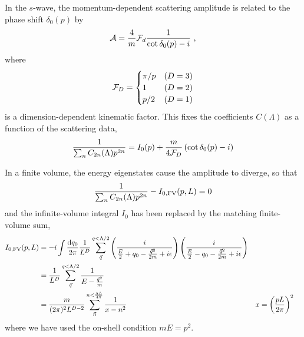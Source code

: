 In the $s$-wave, the momentum-dependent scattering amplitude is related to the phase shift $\delta_0(p)$ by
\begin{equation}\label{eq:cot delta}
    \mathcal{A} = \frac{4}{m}\mathcal{F}_d\frac{1}{\cot \delta_0(p)-i}\ ,
\end{equation}
where
\begin{equation}
    \mathcal{F}_D
    =
    \begin{cases}
        \pi/p   & (D=3)\\
        1       & (D=2)\\
        p/2     & (D=1)
\end{cases}
\end{equation}
is a dimension-dependent kinematic factor.
This fixes the coefficients $C(\Lambda)$ as a function of the scattering data,
\begin{equation}
    \frac{1}{\sum_n C_{2n}(\Lambda) p^{2n}}
    =
    I_0(p) + \frac{m}{4 \mathcal{F}_D}\left(\cot \delta_0(p) - i\right)
\end{equation}

In a finite volume, the energy eigenstates cause the amplitude to diverge, so that
\begin{equation}
    \frac{1}{\sum_n C_{2n}(\Lambda) p^{2n}} - I_{0,\textrm{FV}}(p,L) = 0
\end{equation}
and the infinite-volume integral $I_0$ has been replaced by the matching finite-volume sum,
\begin{align}
I_{0,\textrm{FV}}(p,L)
    &=-i\int \frac { \mathrm {d}q_0}{2\pi} \frac{1}{L^D}\sum_{\vec{q}}^{q < \Lambda/2} \left( \frac { i } { \frac{E}{2} + q _ { 0 } - \frac{\vec{q}^2}{2m} + i \epsilon } \right) \left( \frac { i } { \frac{E}{2} - q _ { 0 } - \frac{\vec{q}^2}{2m} + i \epsilon } \right)
    \\
    &=\frac{1}{L^D}\sum_{\vec{q}}^{q < \Lambda/2} \frac { 1 } { E - \frac{\vec{q}^2}{m} }
    \\
    &=\frac{m}{(2\pi)^2 L^{D-2}} \sum_{\vec{n}}^{n < \frac{\Lambda L}{4\pi}} \frac{1}{x-n^2}
    &
    x &= \left( \frac{pL}{2\pi}\right)^2
\end{align}
where we have used the on-shell condition $mE=p^2$.

